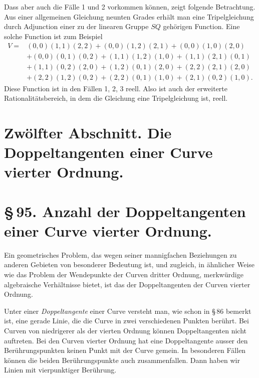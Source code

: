 \documentclass[11pt]{article}
\begin{document}
Dass aber auch die Fälle 1 und 2 vorkommen können, zeigt folgende Betrachtung. Aus einer allgemeinen Gleichung neunten Grades erhält man eine Tripelgleichung durch Adjunction einer zu der linearen Gruppe \(SQ\) gehörigen Function. Eine solche Function ist zum Beispiel
\begin{align*}
 V={}&(0,0)(1,1)(2,2)+(0,0)(1,2)(2,1)+(0,0)(1,0)(2,0)\\
 &+(0,0)(0,1)(0,2)+(1,1)(1,2)(1,0)+(1,1)(2,1)(0,1)\\
 &+(1,1)(0,2)(2,0)+(1,2)(0,1)(2,0)+(2,2)(2,1)(2,0)\\
 &+(2,2)(1,2)(0,2)+(2,2)(0,1)(1,0)+(2,1)(0,2)(1,0).
\end{align*}
Diese Function ist in den Fällen 1, 2, 3 reell. Also ist auch der erweiterte Rationalitätsbereich, in dem die Gleichung eine Tripelgleichung ist, reell.





\section*{Zwölfter Abschnitt. Die Doppeltangenten einer Curve vierter Ordnung.}

\section*{\S\,95. Anzahl der Doppeltangenten einer Curve vierter Ordnung.}

Ein geometrisches Problem, das wegen seiner mannigfachen Beziehungen zu anderen Gebieten von besonderer Bedeutung ist, und zugleich, in ähnlicher Weise wie das Problem der Wendepunkte der Curven dritter Ordnung, merkwürdige algebraische Verhältnisse bietet, ist das der Doppeltangenten der Curven vierter Ordnung.

Unter einer \emph{Doppeltangente} einer Curve versteht man, wie schon in \S\,86 bemerkt ist, eine gerade Linie, die die Curve in zwei verschiedenen Punkten berührt. Bei Curven von niedrigerer als der vierten Ordnung können Doppeltangenten nicht auftreten. Bei den Curven vierter Ordnung hat eine Doppeltangente ausser den Berührungspunkten keinen Punkt mit der Curve gemein. In besonderen Fällen können die beiden Berührungspunkte auch zusammenfallen. Dann haben wir Linien mit vierpunktiger Berührung.
\end{document}
